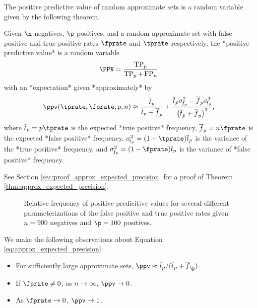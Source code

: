 \documentclass[
]{article}
\providecommand{\tightlist}{%
  \setlength{\itemsep}{0pt}\setlength{\parskip}{0pt}}
\begin{document}
The positive predictive value of random approximate sets is a random
variable given by the following theorem.

\begin{theorem}
\label{thm:approx_expected_precision}
Given $\n$ negatives, $\p$ positives, and a random approximate set with false positive and true positive rates $\fprate$ and $\tprate$ respectively, the *positive predictive value* is a random variable
$$
\PPV = \frac{\operatorname{TP}_p}{\operatorname{TP}_p + \operatorname{FP}_n}
$$
with an *expectation* given *approximately* by
\begin{equation}
\label{eq:approx_expected_precision}
\ppv(\tprate, \fprate,p,n) \approx 
\frac{\overline{t}_p}{\overline{t}_p + \overline{f}_p} +
\frac{\overline{t}_p \sigma_{\!f_p}^2 - \overline{f}_p 
\sigma_{\!t_p}^2}{\left(\overline{t}_p + \overline{f}_p\right)^3},
\end{equation}
where $\overline{t}_p = p \tprate$ is the expected *true positive* frequency,
$\overline{f}_p =  n \fprate$ is the expected *false positive* frequency,
$\sigma_{\!t_p}^2 = (1-\tprate) \overline{t}_p$ is the variance of the
*true positive* frequency, and $\sigma_{\!f_p}^2 = (1-\fprate) \overline{t}_p$
is the variance of *false positive* frequency.
\end{theorem}

See Section \ref{sec:proof_approx_expected_precision} for a proof of
Theorem \ref{thm:approx_expected_precision}.

\begin{figure}
    \def\columnwidth/4{\columnwidth/2}
    \centering
    \captionsetup{justification=centering}
    \caption
    {
        Relative frequency of positive predicitive values for several different parameterizations of the false positive and true positive rates given $n = 900$ negatives and $\p=100$ positives.
    }    
    
    \label{fig:prec_vs_fprate_and_fnrate}
\end{figure}

We make the following observations about Equation
\ref{eq:approx_expected_precision}:

\begin{itemize}
\tightlist
\item
  For sufficiently large approximate sets,
  \(\ppv \approx \overline{t}_p / (\overline{t}_p + \overline{f}_\p)\).
\item
  If \(\fprate \neq 0\), as \(n \to \infty\), \(\ppv \to 0\).
\item
  As \(\fprate \to 0\), \(\ppv \to 1\).
\end{itemize}
\end{document}
